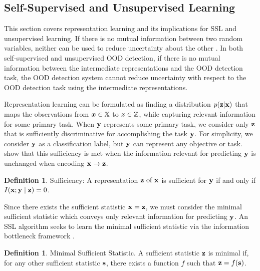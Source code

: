 \documentclass{article} %
\theoremstyle{plain}
\theoremstyle{definition}
\newtheorem{definition}[theorem]{Definition}
\theoremstyle{remark}
\begin{document}
\vspace{-2mm}\subsection{Self-Supervised and Unsupervised Learning}\vspace{-2mm}

This section covers representation learning and its implications for SSL and unsupervised learning. If there is no mutual information between two random variables, neither can be used to reduce uncertainty about the other \citep{shannon1948mathematical}. In both self-supervised and unsupervised OOD detection, if there is no mutual information between the intermediate representations and the OOD detection task, the OOD detection system cannot reduce uncertainty with respect to the OOD detection task using the intermediate representations.  

Representation learning can be formulated as finding a distribution $p({\mathbf{z}}|{\mathbf{x}})$ that maps the observations from ${\bm{x}} \in {\mathbb{X}}$ to ${\bm{z}} \in {\mathbb{Z}}$, while capturing relevant information for some primary task. When ${\mathbf{y}}$ represents some primary task, we consider only ${\mathbf{z}}$ that is sufficiently discriminative for accomplishing the task ${\mathbf{y}}$. For simplicity, we consider ${\mathbf{y}}$ as a classification label, but ${\mathbf{y}}$ can represent any objective or task.  \cite{federici2020learning} show that this sufficiency is met when the information relevant for predicting ${\mathbf{y}}$ is unchanged when encoding ${\mathbf{x}} \rightarrow {\mathbf{z}}$. 

\begin{definition}
    Sufficiency: A representation ${\mathbf{z}} \text { of } {\mathbf{x}}$ is sufficient for ${\mathbf{y}}$ if and only if $I({\mathbf{x}} ; {\mathbf{y}} \mid {\mathbf{z}})=0 $.
    \label{definesuff}
    \vspace{-2mm}
\end{definition}


Since there exists the sufficient statistic ${\mathbf{x}}={\mathbf{z}}$, we must consider the minimal sufficient statistic which conveys only relevant information for predicting ${\mathbf{y}}$. An SSL algorithm seeks to learn the minimal sufficient statistic via the information bottleneck framework \citep{shwartz2023compress}. 


\begin{definition}
Minimal Sufficient Statistic. A sufficient statistic ${\mathbf{z}}$ is minimal if, for any other sufficient statistic ${\mathbf{s}}$, there exists a function $f$ such that ${\mathbf{z}} = f({\mathbf{s}})$.
\label{defineminsuff}
\end{definition}
\end{document}
